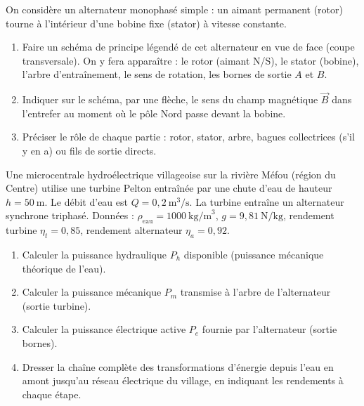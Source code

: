 \documentclass[11pt]{article}
\begin{document}
\begin{exercice}
On considère un alternateur monophasé simple : un aimant permanent (rotor) tourne à l'intérieur d'une bobine fixe (stator) à vitesse constante.
\begin{enumerate}
    \item Faire un schéma de principe légendé de cet alternateur en vue de face (coupe transversale). On y fera apparaître : le rotor (aimant N/S), le stator (bobine), l'arbre d'entraînement, le sens de rotation, les bornes de sortie $A$ et $B$.
    \item Indiquer sur le schéma, par une flèche, le sens du champ magnétique $\vec{B}$ dans l'entrefer au moment où le pôle Nord passe devant la bobine.
    \item Préciser le rôle de chaque partie : rotor, stator, arbre, bagues collectrices (s'il y en a) ou fils de sortie directs.
\end{enumerate}
\end{exercice}

\begin{exercice}
Une microcentrale hydroélectrique villageoise sur la rivière Méfou (région du Centre) utilise une turbine Pelton entraînée par une chute d'eau de hauteur $h = 50~\text{m}$. Le débit d'eau est $Q = 0,2~\text{m}^3/\text{s}$. La turbine entraîne un alternateur synchrone triphasé.
Données : $\rho_{\text{eau}} = 1000~\text{kg/m}^3$, $g = 9,81~\text{N/kg}$, rendement turbine $\eta_t = 0,85$, rendement alternateur $\eta_a = 0,92$.
\begin{enumerate}
    \item Calculer la puissance hydraulique $P_h$ disponible (puissance mécanique théorique de l'eau).
    \item Calculer la puissance mécanique $P_m$ transmise à l'arbre de l'alternateur (sortie turbine).
    \item Calculer la puissance électrique active $P_e$ fournie par l'alternateur (sortie bornes).
    \item Dresser la chaîne complète des transformations d'énergie depuis l'eau en amont jusqu'au réseau électrique du village, en indiquant les rendements à chaque étape.
\end{enumerate}
\end{exercice}
\end{document}
